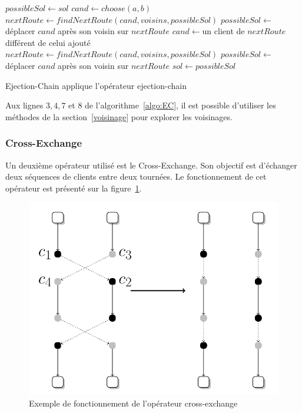 \documentclass[a4paper,11pt]{article}%
\begin{document}
\begin{algorithm}
\DontPrintSemicolon %
$possibleSol \gets sol$\;
$cand \gets choose(a,b)$\;
$nextRoute \gets findNextRoute(cand,voisins,possibleSol)$\;
$possibleSol \gets $ déplacer $cand$ après son voisin sur $nextRoute$\;
 {
  $cand \gets $un client de $nextRoute$ différent de celui ajouté\;
  $nextRoute \gets findNextRoute(cand,voisins,possibleSol)$\;
  $possibleSol \gets$ déplacer $cand$ après son voisin sur $nextRoute$\;
}
 {
	$sol \gets possibleSol$\;
}
\;
\caption{{\sc Ejection-Chain} applique l'opérateur ejection-chain}
\label{algo:EC}
\end{algorithm}

Aux lignes $3, 4, 7$ et $8$ de l'algorithme~\ref{algo:EC}, il est possible d'utiliser les méthodes de la section~\ref{voisinage} pour explorer les voisinages.

\subsubsection{Cross-Exchange}

Un deuxième opérateur utilisé est le Cross-Exchange.
Son objectif est d'échanger deux séquences de clients entre deux tournées.
Le fonctionnement de cet opérateur est présenté sur la figure~\ref{CE}.

\begin{figure}
\centering
\includegraphics[scale=0.2]{cross_exchange_big.png}
\caption{Exemple de fonctionnement de l'opérateur cross-exchange}
\label{CE}
\end{figure}
\end{document}
